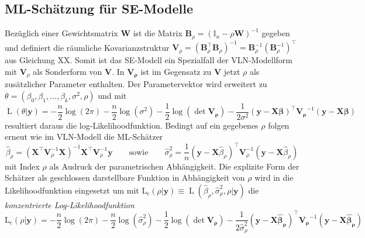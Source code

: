 \subsection{ML-Schätzung für SE-Modelle}
Bezüglich einer Gewichtsmatrix $\mathbf{W}$ ist die Matrix $\mathbf{B}_{\rho}=(\mathds{I}_{n} - \rho \mathbf{W})^{-1}$ gegeben und 
definiert die räumliche Kovarianzstruktur $\mathbf{V}_{\rho}=\left(\mathbf{B}_{\rho}^{\top} \mathbf{B}_{\rho} \right)^{-1} 
=\mathbf{B}_{\rho}^{-1} \left(\mathbf{B}_{\rho}^{-1}\right)^{\top}$ aus Gleichung XX. 
Somit ist das SE-Modell ein Spezialfall der VLN-Modellform mit $\mathbf{V}_{\rho}$ als Sonderform von $\mathbf{V}$. 
In $\mathbf{V_{\rho}}$ ist im Gegensatz zu $\mathbf{V}$ jetzt $\rho$ als zusätzlicher Parameter enthalten. Der Parametervektor wird erweitert zu 
$\theta=(\beta_{0},\beta_{1},\ldots,\beta_{k},\sigma^{2},\rho)$ und mit
\begin{equation*}
    \operatorname{L}(\theta|\mathbf{y})= -\frac{n}{2} \log(2\pi) -\frac{n}{2} \log(\sigma^{2}) -\frac{1}{2} \log(\det \mathbf{V_{\rho}} )
    -\frac{1}{2\sigma^{2}} \left( \mathbf{y-X\beta} \right)^{\top} \mathbf{V_{\rho}}^{-1} \left( \mathbf{y-X\beta} \right)
\end{equation*}
resultiert daraus die log-Likelihoodfunktion. Bedingt auf ein gegebenes $\rho$ folgen erneut wie im VLN-Modell 
die ML-Schätzer 
\begin{equation*}
    \hat{\beta}_{\rho} = \left( \mathbf{X}^{\top} \mathbf{V}_{\rho}^{-1} \mathbf{X} \right)^{-1}
    \mathbf{X}^{\top} \mathbf{V}_{\rho}^{-1} \mathbf{y} 
    \qquad \text{sowie} \qquad
    \hat{\sigma}_{\rho}^{2} = \frac{1}{n} \left( \mathbf{y} - \mathbf{X} \hat{\beta}_{\rho} \right)^{\top} 
    \mathbf{V}_{\rho}^{-1} \left( \mathbf{y}- \mathbf{X} \hat{\beta}_{\rho} \right)
\end{equation*}
mit Index $\rho$ als Audruck der parametrischen Abhängigkeit. 
Die explizite Form der Schätzer als geschlossen darstellbare Funktion in Abhängigkeit von $\rho$ wird in 
die Likelihoodfunktion eingesetzt um mit 
$ \operatorname{L_{c}}(\rho|\mathbf{y}) \equiv \operatorname{L}(\hat{\beta}_{\rho},\hat{\sigma}_{\rho}^{2},\rho|\mathbf{y}) $ 
die \emph{konzentrierte Log-Likelihoodfunktion} 
\begin{equation*}
    \operatorname{L_{c}}(\rho|\mathbf{y})= -\frac{n}{2} \log(2\pi) -\frac{n}{2} \log(\hat{\sigma}_{\rho}^{2}) -\frac{1}{2} \log(\det \mathbf{V_{\rho}} )
    -\frac{1}{2 \hat{\sigma}_{\rho}^{2}} \left( \mathbf{y-X \hat{\beta}_{\rho}} \right)^{\top} \mathbf{V_{\rho}}^{-1} \left( \mathbf{y-X \hat{\beta}_{\rho}} \right)
\end{equation*}
